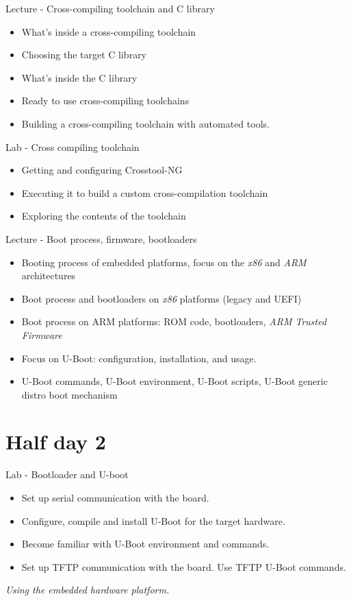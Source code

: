 \documentclass[a4paper,12pt,obeyspaces,spaces,hyphens]{article}
\begin{document}
\feagendatwocolumn
{Lecture - Cross-compiling toolchain and C library}
{
  \begin{itemize}
  \item What's inside a cross-compiling toolchain
  \item Choosing the target C library
  \item What's inside the C library
  \item Ready to use cross-compiling toolchains
  \item Building a cross-compiling toolchain with automated tools.
  \end{itemize}
}
{Lab - Cross compiling toolchain}
{
  \begin{itemize}
  \item Getting and configuring Crosstool-NG
  \item Executing it to build a custom cross-compilation toolchain
  \item Exploring the contents of the toolchain
  \end{itemize}
}

\feagendaonecolumn
{Lecture - Boot process, firmware, bootloaders}
{
  \begin{itemize}
  \item Booting process of embedded platforms, focus on the {\em x86}
    and {\em ARM} architectures
  \item Boot process and bootloaders on {\em x86} platforms (legacy
    and UEFI)
  \item Boot process on ARM platforms: ROM code, bootloaders, {\em ARM
      Trusted Firmware}
  \item Focus on U-Boot: configuration, installation, and usage.
  \item U-Boot commands, U-Boot environment, U-Boot scripts, U-Boot
    generic distro boot mechanism
  \end{itemize}
}

\section{Half day 2}

\feagendaonecolumn
{Lab - Bootloader and U-boot}
{
  \begin{itemize}
  \item Set up serial communication with the board.
  \item Configure, compile and install U-Boot for the target hardware.
  \item Become familiar with U-Boot environment and commands.
  \item Set up TFTP communication with the board. Use TFTP U-Boot
    commands.
  \end{itemize}

  \vspace{0.5cm}
  {\em Using the embedded hardware platform.}
}
\end{document}
